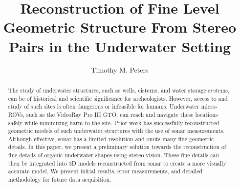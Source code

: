 \documentclass{llncs}
\begin{document}
\frontmatter          %
%
\pagestyle{headings}  %
%
%
\title{Reconstruction of Fine Level Geometric Structure From Stereo Pairs in the Underwater Setting}
%
%
\author{Timothy M. Peters} %
%
%
%

\maketitle              %

\begin{abstract}
The study of underwater structures, such as wells, cisterns, and water storage systems, can be of historical and scientific significance for archeologists. However, access to and study of such sites is often dangerous or infeasible for humans. Underwater micro-ROVs, such as the VideoRay Pro III GTO, can reach and navigate these locations safely while minimizing harm to the site. Prior work has successfully reconstructed geometric models of such underwater structures with the use of sonar measurements. Although effective, sonar has a limited resolution and omits many fine geometric details. In this paper, we present a preliminary solution towards the reconstruction of fine details of organic underwater shapes using stereo vision. These fine details can then be integrated into 3D models reconstructed from sonar to create a more visually accurate model. We present initial results, error measurements, and detailed methodology for future data acquisition.
\end{abstract}
%
\end{document}
